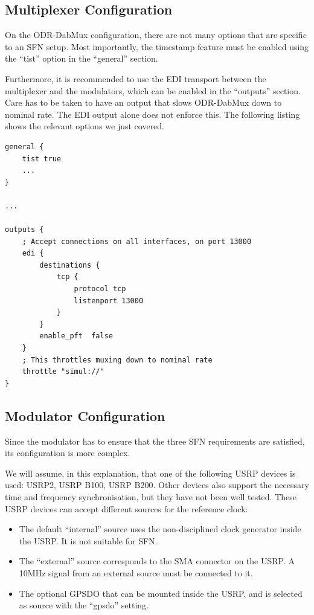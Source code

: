 
\subsection{Multiplexer Configuration}
On the ODR-DabMux configuration, there are not many options that are specific to
an SFN setup.
Most importantly, the timestamp feature must be enabled using the ``tist'' option in
the ``general'' section.

Furthermore, it is recommended to use the EDI transport between the
multiplexer and the modulators, which can be enabled in the ``outputs'' section.
Care has to be taken to have an output that slows ODR-DabMux down to nominal
rate. The EDI output alone does not enforce this. The following listing shows
the relevant options we just covered.

\begin{lstlisting}
general {
    tist true
    ...
}

...

outputs {
    ; Accept connections on all interfaces, on port 13000
    edi {
        destinations {
            tcp {
                protocol tcp
                listenport 13000
            }
        }
        enable_pft  false
    }
    ; This throttles muxing down to nominal rate
    throttle "simul://"
}
\end{lstlisting}

\subsection{Modulator Configuration}
Since the modulator has to ensure that the three SFN requirements are satisfied,
its configuration is more complex.

We will assume, in this explanation, that one of the following USRP devices is
used: USRP2, USRP B100, USRP B200. Other devices also support the necessary time
and frequency synchronisation, but they have not been well tested. These USRP
devices can accept different sources for the reference clock:
\begin{itemize}
    \item The default ``internal'' source uses the non-disciplined
        clock generator inside the USRP. It is not suitable for SFN.
    \item The ``external'' source corresponds to the SMA connector on
        the USRP. A 10MHz signal from an external source must be connected to
        it.
    \item The optional GPSDO that can be mounted inside the USRP, and is
        selected as source with the ``gpsdo'' setting.
\end{itemize}

